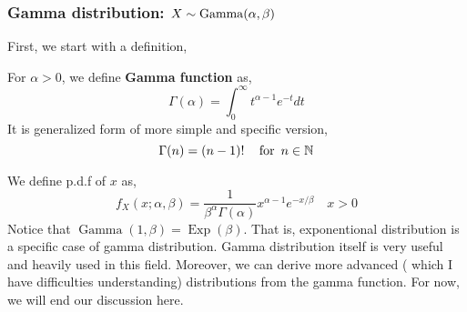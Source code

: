 \subsubsection*{Gamma distribution: $X \sim \operatorname{Gamma} (\alpha, \beta)$}
First, we start with a definition,
\begin{definition}
    For $\alpha > 0$, we define \textbf{Gamma function} as,
    \[\Gamma(\alpha) = \int_{0}^{\infty} t^{\alpha-1} e^{-t}dt\]
    It is generalized form of more simple and specific version, 
    \[ \Gamma(n) = (n-1)! \quad \operatorname{for} \ n \in \mathbb{N} \]
\end{definition}
    We define p.d.f of $x$ as,
    \[f_X(x; \alpha, \beta) =  \frac{1}{\beta^{\alpha} \Gamma(\alpha)} x^{\alpha-1} e^{-x/ \beta} \quad x > 0\]
    Notice that $ \operatorname{Gamma}(1, \beta) =\operatorname{Exp}( \beta)$. That is, exponentional distribution is a specific case of gamma distribution.
    Gamma distribution itself is very useful and heavily used in this field. Moreover, we can derive more advanced ( which I have difficulties understanding) distributions from the gamma function. For now, we will end our discussion here.

